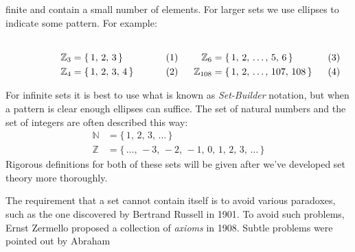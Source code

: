     finite and contain a small number of elements. For larger sets we use
    ellipses to indicate some pattern. For example:
    \par
    \begin{subequations}
        \begin{minipage}[b]{0.49\textwidth}
            \centering
            \begin{align}
                \mathbb{Z}_{3}&=\{\,1,\,2,\,3\,\}\\
                \mathbb{Z}_{4}&=\{\,1,\,2,\,3,\,4\,\}
            \end{align}
        \end{minipage}
        \hfill
        \begin{minipage}[b]{0.49\textwidth}
            \centering
            \begin{align}
                \mathbb{Z}_{6}  &=\{\,1,\,2,\,\dots,\,5,\,6\,\}\\
                \mathbb{Z}_{108}&=\{\,1,\,2,\,\dots,\,107,\,108\,\}
            \end{align}
        \end{minipage}
    \end{subequations}
    \par\vspace{2.5ex}
    For infinite sets it is best to use what is known as
    \textit{Set-Builder} notation, but when a pattern is clear enough
    ellipses can suffice. The set of natural numbers and the set of
    integers are often described this way:
    \begin{subequations}
        \begin{align}
            \label{eqn:Natural_Numbers_Ellipses}%
            \mathbb{N}&=\{\,1,\,2,\,3,\,\dots\,\}\\
            \label{eqn:Integers_Ellipses}%
            \mathbb{Z}&=\{\,\dots,\,\minus{3},\,\minus{2},\,\minus{1},\,
                            0,\,1,\,2,\,3,\,\dots\,\}
        \end{align}
    \end{subequations}
    Rigorous definitions for both of these sets will be given after we've
    developed set theory more thoroughly.
    \par\hfill\par
    The requirement that a set cannot contain itself is to avoid various
    paradoxes, such as the one discovered by Bertrand Russell in 1901. To
    avoid such problems, Ernst Zermello proposed a collection of
    \textit{axioms} in 1908. Subtle problems were pointed out by Abraham
